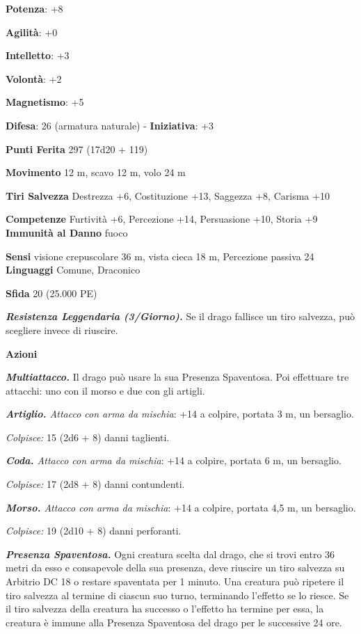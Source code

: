 \begin{multicols}{2}
\textbf{Potenza}: +8

\textbf{Agilità}: +0

\textbf{Intelletto}: +3

\textbf{Volontà}: +2

\textbf{Magnetismo}: +5

\textbf{Difesa}: 26 (armatura naturale) - \textbf{Iniziativa}: +3

\textbf{Punti Ferita} 297 (17d20 + 119)

\textbf{Movimento} 12 m, scavo 12 m, volo 24 m

\textbf{Tiri Salvezza} Destrezza +6, Costituzione +13, Saggezza +8,
Carisma +10

\textbf{Competenze} Furtività +6, Percezione +14, Persuasione +10, Storia
+9 \textbf{Immunità al Danno} fuoco

\textbf{Sensi} visione crepuscolare 36 m, vista cieca 18 m, Percezione passiva
24 \textbf{Linguaggi} Comune, Draconico

\textbf{Sfida} 20 (25.000 PE)

\emph{\textbf{Resistenza Leggendaria (3/Giorno).}} Se il drago fallisce
un tiro salvezza, può scegliere invece di riuscire.

\textbf{Azioni}

\emph{\textbf{Multiattacco.}} Il drago può usare la sua Presenza
Spaventosa. Poi effettuare tre attacchi: uno con il morso e due con gli
artigli.

\emph{\textbf{Artiglio.} Attacco con arma da mischia}: +14 a colpire,
portata 3 m, un bersaglio.

\emph{Colpisce:} 15 (2d6 + 8) danni taglienti.

\emph{\textbf{Coda.} Attacco con arma da mischia}: +14 a colpire,
portata 6 m, un bersaglio.

\emph{Colpisce:} 17 (2d8 + 8) danni contundenti.

\emph{\textbf{Morso.} Attacco con arma da mischia}: +14 a colpire,
portata 4,5 m, un bersaglio.

\emph{Colpisce:} 19 (2d10 + 8) danni perforanti.

\emph{\textbf{Presenza Spaventosa.}} Ogni creatura scelta dal drago, che
si trovi entro 36 metri da esso e consapevole della sua presenza, deve
riuscire un tiro salvezza su Arbitrio DC 18 o restare spaventata per 1
minuto. Una creatura può ripetere il tiro salvezza al termine di ciascun
suo turno, terminando l'effetto se lo riesce. Se il tiro salvezza della
creatura ha successo o l'effetto ha termine per essa, la creatura è
immune alla Presenza Spaventosa del drago per le successive 24 ore.


\end{multicols}

